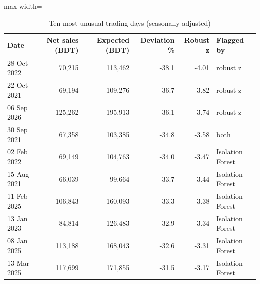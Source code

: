 \begin{table}[htbp]
\centering
\small
\caption{Ten most unusual trading days (seasonally adjusted)}
\label{tab:dailyanom}
\begin{adjustbox}{max width=\linewidth}
\begin{tabular}{lrrrrl}
\toprule
\textbf{Date} & \textbf{Net sales (BDT)} & \textbf{Expected (BDT)} & \textbf{Deviation \%} & \textbf{Robust z} & \textbf{Flagged by} \\
\midrule
28 Oct 2022 & 70,215 & 113,462 & -38.1 & -4.01 & robust z \\
22 Oct 2021 & 69,194 & 109,276 & -36.7 & -3.82 & robust z \\
06 Sep 2026 & 125,262 & 195,913 & -36.1 & -3.74 & robust z \\
30 Sep 2021 & 67,358 & 103,385 & -34.8 & -3.58 & both \\
02 Feb 2022 & 69,149 & 104,763 & -34.0 & -3.47 & Isolation Forest \\
15 Aug 2021 & 66,039 & 99,664 & -33.7 & -3.44 & Isolation Forest \\
11 Feb 2025 & 106,843 & 160,093 & -33.3 & -3.38 & Isolation Forest \\
13 Jan 2023 & 84,814 & 126,483 & -32.9 & -3.34 & Isolation Forest \\
08 Jan 2025 & 113,188 & 168,043 & -32.6 & -3.31 & Isolation Forest \\
13 Mar 2025 & 117,699 & 171,855 & -31.5 & -3.17 & Isolation Forest \\
\bottomrule
\end{tabular}
\end{adjustbox}
\end{table}